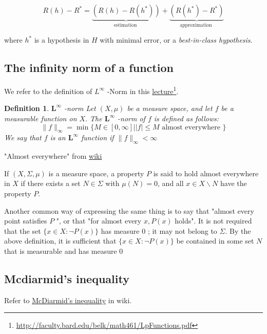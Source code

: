 \documentclass[12pt]{article}
\newtheorem{defn}[thm]{Definition}
\theoremstyle{definition}
\begin{document}
$$
R(h)-R^{*}=\underbrace{\left(R(h)-R\left(h^{*}\right)\right)}_{\text {estimation }}+\underbrace{\left(R\left(h^{*}\right)-R^{*}\right)}_{\text {approximation }}
$$

where $h^*$ is a hypothesis in $H$ with minimal error, or a \emph{best-in-class hypothesis}.

\subsection{The infinity norm of a function}
We refer to the definition of $L^{\infty}$ -Norm in this \href{http://faculty.bard.edu/belk/math461/LpFunctions.pdf}{lecture}\footnote{\href{http://faculty.bard.edu/belk/math461/LpFunctions.pdf}{http://faculty.bard.edu/belk/math461/LpFunctions.pdf}}.

\begin{defn}{$\boldsymbol{L}^{\infty}$ -norm}
	Let $(X, \mu)$ be a measure space, and let $f$ be a measurable function on $X .$ The $\boldsymbol{L}^{\infty}$ -norm of $f$ is defined as follows:
	\[
	\|f\|_{\infty}=\min \{M \in[0, \infty]\big| | f | \leq M \text { almost everywhere }\}
	\]
	We say that $f$ is an $\boldsymbol{L}^{\infty}$ function if $\|f\|_{\infty}<\infty$
\end{defn}


\begin{paragraph}
	"Almost everywhere" from \href{https://en.wikipedia.org/wiki/Almost_everywhere#Definition}{wiki}
	
	If $(X, \Sigma, \mu)$ is a measure space, a property $P$ is said to hold almost everywhere in $X$ if there exists a set $N \in \Sigma$ with $\mu(N)=0$, and all $x \in X \backslash N$ have the property $P$. 
	
	Another common way of expressing the same thing is to say that "almost every point satisfies $P$ ", or that "for almost every $x, P(x)$ holds".
	It is not required that the set $\{x \in X: \neg P(x)\}$ has measure 0 ; it may not belong to $\Sigma$. By the above definition, it is sufficient that $\{x \in X: \neg P(x)\}$ be contained in some set $N$ that is measurable and has measure 0
\end{paragraph}


\subsection{Mcdiarmid's inequality}
Refer to \href{https://en.wikipedia.org/wiki/Doob_martingale#McDiarmid's_inequality}{McDiarmid's inequality} in wiki.
\end{document}
